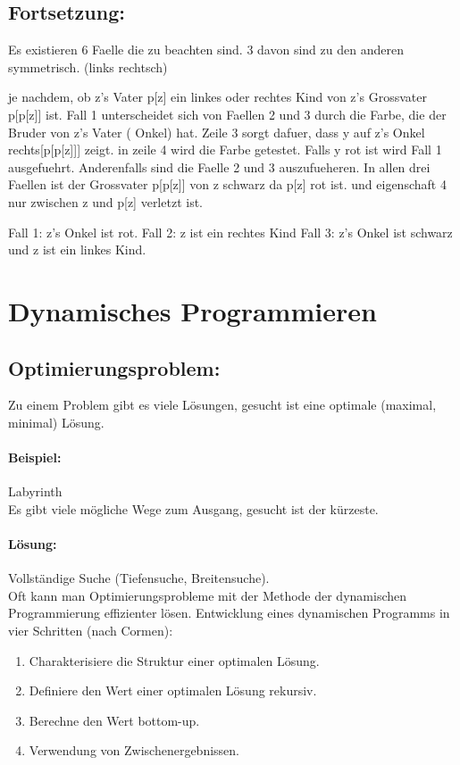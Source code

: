 \documentclass[a4paper]{scrartcl}
\begin{document}
\subsection*{Fortsetzung: }
Es existieren 6 Faelle die zu beachten sind. 
3 davon sind zu den anderen symmetrisch. (links rechtsch)

je nachdem, ob z's Vater p[z] ein linkes oder rechtes Kind von z's Grossvater p[p[z]] ist.
Fall 1 unterscheidet sich von Faellen 2 und 3 durch die Farbe, die der Bruder von z's Vater ( Onkel) hat. Zeile 3 sorgt dafuer, dass y auf z's Onkel rechts[p[p[z]]] zeigt. in zeile 4 wird die Farbe getestet. Falls y rot ist wird Fall 1 ausgefuehrt.
Anderenfalls sind die Faelle 2 und 3 auszufueheren. In allen drei Faellen ist der Grossvater p[p[z]] von z schwarz da p[z] rot ist. und eigenschaft 4 nur zwischen z und p[z] verletzt ist. 


Fall 1: z's Onkel ist rot.
Fall 2: z ist ein rechtes Kind
Fall 3: z's Onkel ist schwarz und z ist ein linkes Kind.




\section{Dynamisches Programmieren}
\subsection{Optimierungsproblem:} Zu einem Problem gibt es viele Lösungen, gesucht ist eine optimale (maximal, minimal) Lösung.
\paragraph{Beispiel:} Labyrinth\\
Es gibt viele mögliche Wege zum Ausgang, gesucht ist der kürzeste.
\paragraph{Lösung:} Vollständige Suche (Tiefensuche, Breitensuche).\\
Oft kann man Optimierungsprobleme mit der Methode der dynamischen Programmierung effizienter lösen. Entwicklung eines dynamischen Programms in vier Schritten (nach Cormen):
\begin{enumerate}
\item Charakterisiere die Struktur einer optimalen Lösung.
\item Definiere den Wert einer optimalen Lösung rekursiv.
\item Berechne den Wert \glqq bottom-up\grqq .
\item Verwendung von Zwischenergebnissen.
\end{enumerate}
\end{document}
